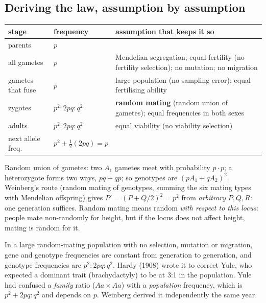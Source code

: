 \subsection{Deriving the law, assumption by assumption}
\begin{center}\small
\begin{tabularx}{\textwidth}{lXX}
\toprule
stage & frequency & assumption that keeps it so\\\midrule
parents & $p$ & \\
all gametes & $p$ & Mendelian segregation; equal fertility (no fertility selection); no mutation; no migration\\
gametes that fuse & $p$ & large population (no sampling error); equal fertilising ability\\
zygotes & $p^2:2pq:q^2$ & \textbf{random mating} (random union of gametes); equal frequencies in both sexes\\
adults & $p^2:2pq:q^2$ & equal viability (no viability selection)\\
next allele freq. & $p^2+\tfrac12(2pq)=p$ & \\\bottomrule
\end{tabularx}
\end{center}
Random union of gametes: two $A_1$ gametes meet with probability $p\cdot p$; a heterozygote forms two ways, $pq+qp$; so
genotypes are $(pA_1+qA_2)^2$. Weinberg's route (random mating of genotypes, summing the six mating types with Mendelian
offspring) gives $P'=(P+Q/2)^2=p^2$ from \emph{arbitrary} $P,Q,R$: one generation suffices. Random mating means random
\emph{with respect to this locus}: people mate non-randomly for height, but if the locus does not affect height, mating
is random for it.

\begin{keyidea}
In a large random-mating population with no selection, mutation or migration, gene and genotype frequencies are constant
from generation to generation, and genotype frequencies are $p^2:2pq:q^2$. Hardy (1908) wrote it to correct Yule, who
expected a dominant trait (brachydactyly) to be at 3:1 in the population. Yule had confused a \emph{family} ratio
($Aa\times Aa$) with a \emph{population} frequency, which is $p^2+2pq:q^2$ and depends on $p$. Weinberg derived it
independently the same year.
\end{keyidea}

